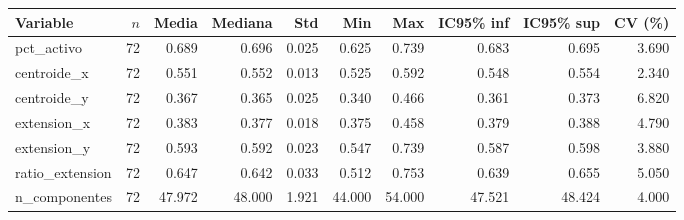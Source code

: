 \begin{tabular}{lrrrrrrrrr}
\toprule
Variable & $n$ & Media & Mediana & Std & Min & Max & IC95\% inf & IC95\% sup & CV (\%) \\
\midrule
pct_activo & 72 & 0.689 & 0.696 & 0.025 & 0.625 & 0.739 & 0.683 & 0.695 & 3.690 \\
centroide_x & 72 & 0.551 & 0.552 & 0.013 & 0.525 & 0.592 & 0.548 & 0.554 & 2.340 \\
centroide_y & 72 & 0.367 & 0.365 & 0.025 & 0.340 & 0.466 & 0.361 & 0.373 & 6.820 \\
extension_x & 72 & 0.383 & 0.377 & 0.018 & 0.375 & 0.458 & 0.379 & 0.388 & 4.790 \\
extension_y & 72 & 0.593 & 0.592 & 0.023 & 0.547 & 0.739 & 0.587 & 0.598 & 3.880 \\
ratio_extension & 72 & 0.647 & 0.642 & 0.033 & 0.512 & 0.753 & 0.639 & 0.655 & 5.050 \\
n_componentes & 72 & 47.972 & 48.000 & 1.921 & 44.000 & 54.000 & 47.521 & 48.424 & 4.000 \\
\bottomrule
\end{tabular}
